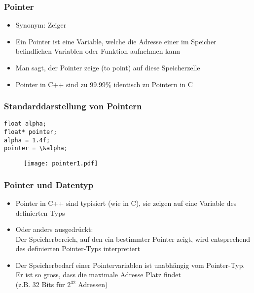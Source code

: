 \subsubsection{Pointer\hfill}
\label{sec:unterunterabschnitt}
\begin{itemize}
	\item Synonym: Zeiger
	\item Ein Pointer ist eine Variable, welche die Adresse einer im Speicher befindlichen Variablen oder Funktion aufnehmen kann
	\item Man sagt, der Pointer zeige (to point) auf diese Speicherzelle
	\item Pointer in C++ sind zu 99.99\% identisch zu Pointern in C
\end{itemize}

\subsubsection{Standarddarstellung von Pointern\hfill}
\label{sec:unterunterabschnitt}
\noindent
\begin{minipage}{\linewidth}
\begin{lstlisting}
float alpha;
float* pointer;
alpha = 1.4f;
pointer = \&alpha;
 \end{lstlisting}
\end{minipage}
\begin{figure}[h]
	\centering
	\texttt{[image: pointer1.pdf]}
\end{figure}

\subsubsection{Pointer und Datentyp\hfill}
\label{sec:unterunterabschnitt}
\begin{itemize}
	\item Pointer in C++ sind typisiert (wie in C), sie zeigen auf eine Variable des definierten Typs
	\item Oder anders ausgedrückt:
		\\ Der Speicherbereich, auf den ein bestimmter Pointer zeigt, wird entsprechend des definierten Pointer-Typs interpretiert
	\item Der Speicherbedarf einer Pointervariablen ist unabhängig vom Pointer-Typ. Er ist so gross, dass die maximale Adresse Platz findet
		\\ (z.B. 32 Bits für $2^{32}$ Adressen)
\end{itemize}


